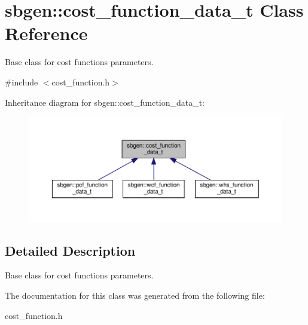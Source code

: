 \hypertarget{classsbgen_1_1cost__function__data__t}{}\section{sbgen\+:\+:cost\+\_\+function\+\_\+data\+\_\+t Class Reference}
\label{classsbgen_1_1cost__function__data__t}


Base class for cost functions parameters.  




{\ttfamily \#include $<$cost\+\_\+function.\+h$>$}



Inheritance diagram for sbgen\+:\+:cost\+\_\+function\+\_\+data\+\_\+t\+:
\nopagebreak
\begin{figure}[H]
\begin{center}
\leavevmode
\includegraphics[width=350pt]{classsbgen_1_1cost__function__data__t__inherit__graph}
\end{center}
\end{figure}


\subsection{Detailed Description}
Base class for cost functions parameters. 

The documentation for this class was generated from the following file\+:\begin{DoxyCompactItemize}
\item 
cost\+\_\+function.\+h\end{DoxyCompactItemize}
